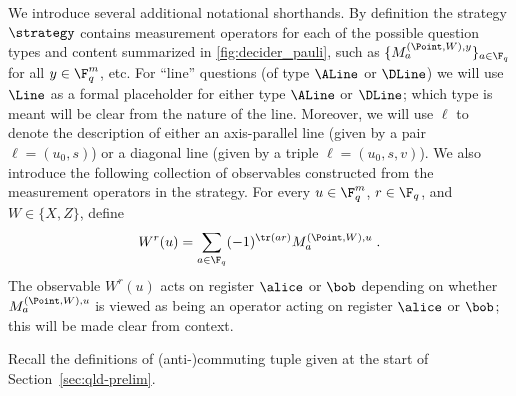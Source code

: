We introduce several additional notational shorthands. By definition the strategy $\strategy$ contains measurement
  operators for each of the possible question types and content
  summarized in \cref{fig:decider_pauli}, such as $\{M^{(\Point,
    W),y}_a\}_{a\in\F_q}$ for all $y\in\F_q^m$, etc. 
For ``line'' questions (of type $\ALine$ or $\DLine$) we will use
 $\Line$ as a formal placeholder for either type $\ALine$ or $\DLine$;
  which type is meant will be clear from the nature of the
  line. Moreover, we will use $\ell$ to denote the description of
  either an axis-parallel line (given by a pair $\ell=(u_0, s)$) or a
  diagonal line (given by a triple $\ell=(u_0, s, v)$). We also introduce the following collection of observables constructed from the
  measurement operators in the strategy. 	
	For every $u \in
  \F_q^m$, $r \in \F_q$, and $W \in \{X, Z\}$, define
  \begin{equation}
    W^r(u) =\sum_{a\in\F_q} (-1)^{\tr(ar)}  M^{(\Point, W), u}_a\;. \label{eq:qld-strat-obs}
  \end{equation}
	The observable $W^r(u)$ acts on register $\alice$ or $\bob$ depending on whether $M^{(\Point, W), u}_a$ is viewed as being an operator acting on register $\alice$ or $\bob$; this will be made clear from context.
	



Recall the definitions of (anti-)commuting tuple given at the start of Section~\ref{sec:qld-prelim}. 


